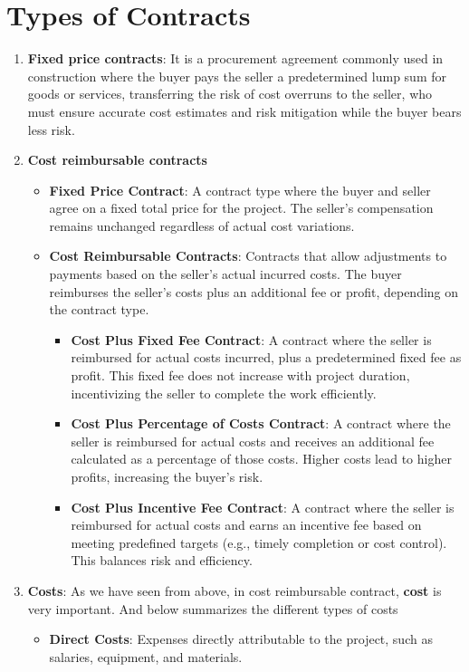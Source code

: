 \documentclass[math,code]{amznotes}
\theoremstyle{remark}
\begin{document}
\section{Types of Contracts}
\begin{enumerate}
    \item \textbf{Fixed price contracts}: It is a procurement agreement commonly used in construction where the buyer pays the seller a predetermined lump sum for goods or services, transferring the risk of cost overruns to the seller, who must ensure accurate cost estimates and risk mitigation while the buyer bears less risk.
    \item \textbf{Cost reimbursable contracts}
    \begin{itemize}
        \item \textbf{Fixed Price Contract}: A contract type where the buyer and seller agree on a fixed total price for the project. The seller’s compensation remains unchanged regardless of actual cost variations.
        \item \textbf{Cost Reimbursable Contracts}: Contracts that allow adjustments to payments based on the seller’s actual incurred costs. The buyer reimburses the seller’s costs plus an additional fee or profit, depending on the contract type.
        \begin{itemize}
            \item \textbf{Cost Plus Fixed Fee Contract}: A contract where the seller is reimbursed for actual costs incurred, plus a predetermined fixed fee as profit. This fixed fee does not increase with project duration, incentivizing the seller to complete the work efficiently.
            \item \textbf{Cost Plus Percentage of Costs Contract}: A contract where the seller is reimbursed for actual costs and receives an additional fee calculated as a percentage of those costs. Higher costs lead to higher profits, increasing the buyer’s risk.
            \item \textbf{Cost Plus Incentive Fee Contract}: A contract where the seller is reimbursed for actual costs and earns an incentive fee based on meeting predefined targets (e.g., timely completion or cost control). This balances risk and efficiency.
        \end{itemize}
    \end{itemize}
    \item \textbf{Costs}: As we have seen from above, in cost reimbursable contract, \textbf{cost} is very important. And below summarizes the different types of costs
    \begin{itemize}
        \item \textbf{Direct Costs}: Expenses directly attributable to the project, such as salaries, equipment, and materials.
        

\end{itemize}
\end{enumerate}
\end{document}
